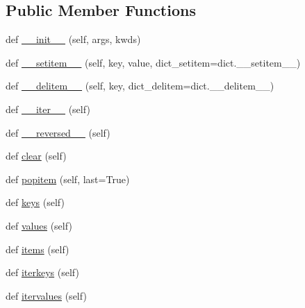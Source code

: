 \subsection*{Public Member Functions}
\begin{DoxyCompactItemize}
\item 
def \hyperlink{classpip_1_1__vendor_1_1distlib_1_1compat_1_1OrderedDict_a0b3f11702cdd50f0a81036f48bcdf9a4}{\+\_\+\+\_\+init\+\_\+\+\_\+} (self, args, kwds)
\item 
def \hyperlink{classpip_1_1__vendor_1_1distlib_1_1compat_1_1OrderedDict_a6ab8a22c72107501120695539e652957}{\+\_\+\+\_\+setitem\+\_\+\+\_\+} (self, key, value, dict\+\_\+setitem=dict.\+\_\+\+\_\+setitem\+\_\+\+\_\+)
\item 
def \hyperlink{classpip_1_1__vendor_1_1distlib_1_1compat_1_1OrderedDict_ad3607cff5ca78fe5a47d9f09a4b47197}{\+\_\+\+\_\+delitem\+\_\+\+\_\+} (self, key, dict\+\_\+delitem=dict.\+\_\+\+\_\+delitem\+\_\+\+\_\+)
\item 
def \hyperlink{classpip_1_1__vendor_1_1distlib_1_1compat_1_1OrderedDict_aacc2ceffa86e468e6147cfa3a5cd345b}{\+\_\+\+\_\+iter\+\_\+\+\_\+} (self)
\item 
def \hyperlink{classpip_1_1__vendor_1_1distlib_1_1compat_1_1OrderedDict_a6d6bd1a3fad31c1d15dd21b79ee0786d}{\+\_\+\+\_\+reversed\+\_\+\+\_\+} (self)
\item 
def \hyperlink{classpip_1_1__vendor_1_1distlib_1_1compat_1_1OrderedDict_ab617c023d1100922375c6477ef289231}{clear} (self)
\item 
def \hyperlink{classpip_1_1__vendor_1_1distlib_1_1compat_1_1OrderedDict_aab80d19ece4d802bdfb35042203ffa65}{popitem} (self, last=True)
\item 
def \hyperlink{classpip_1_1__vendor_1_1distlib_1_1compat_1_1OrderedDict_a702b14e54ebe69ab4ddcf4ce0acccca7}{keys} (self)
\item 
def \hyperlink{classpip_1_1__vendor_1_1distlib_1_1compat_1_1OrderedDict_ae885e700527a49116c9ba513931ee1e5}{values} (self)
\item 
def \hyperlink{classpip_1_1__vendor_1_1distlib_1_1compat_1_1OrderedDict_a97f6c8e438a9fd542ea4379858e9586a}{items} (self)
\item 
def \hyperlink{classpip_1_1__vendor_1_1distlib_1_1compat_1_1OrderedDict_a3b4c1a9145ab532da5e134d099863dfd}{iterkeys} (self)
\item 
def \hyperlink{classpip_1_1__vendor_1_1distlib_1_1compat_1_1OrderedDict_aad4371d22b46e3d2483fc544afd0aadf}{itervalues} (self)
\item 

\end{DoxyCompactItemize}
